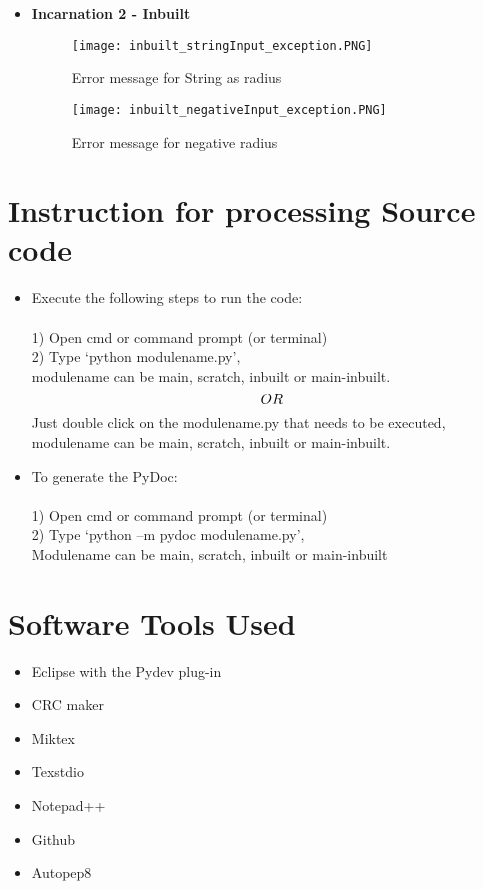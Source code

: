 \documentclass[11pt]{article}
\begin{document}
		\newpage
		\begin{itemize}	
			\item \textbf{Incarnation 2 - Inbuilt}
			\begin{figure}[h!]
				\texttt{[image: inbuilt\_stringInput\_exception.PNG]} %
				\caption{Error message for String as radius}
			\end{figure}
			
			\begin{figure}[h!]
				\texttt{[image: inbuilt\_negativeInput\_exception.PNG]} %
				\caption{Error message for negative radius}
			\end{figure}
		\end{itemize}
	

\newpage
\section{Instruction for processing Source code}
	
	\begin{itemize}
		\item Execute the following steps to run the code:\\\\
			1)	Open cmd or command prompt (or terminal)\\
			2)	Type ‘python modulename.py’,\\
			modulename can be main, scratch, inbuilt or main-inbuilt.\\
			$$OR\\$$
			Just double click on the modulename.py that needs to be executed, modulename can be main, scratch, inbuilt or main-inbuilt.
	
		\item To generate the PyDoc: \\\\
			1)	Open cmd or command prompt (or terminal)\\
			2)	Type ‘python –m pydoc modulename.py’,\\
			Modulename can be main, scratch, inbuilt or main-inbuilt\\
	\end{itemize}


\section{Software Tools Used}
		
		\begin{itemize}
			\item Eclipse with the Pydev plug-in
			\item CRC maker
			\item Miktex
			\item Texstdio
			\item Notepad++
			\item Github
			\item Autopep8
		\end{itemize}
\end{document}
